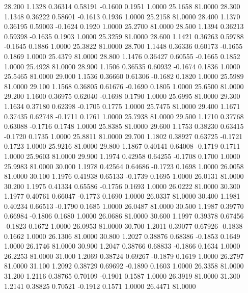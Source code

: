   28.200   1.1328   0.36314   0.58191  -0.1600   0.1951   1.0000  25.1658  81.0000
  28.300   1.1348   0.36222   0.58601  -0.1613   0.1936   1.0000  25.2158  81.0000
  28.400   1.1370   0.36195   0.59003  -0.1624   0.1920   1.0000  25.2700  81.0000
  28.500   1.1394   0.36213   0.59398  -0.1635   0.1903   1.0000  25.3259  81.0000
  28.600   1.1421   0.36263   0.59788  -0.1645   0.1886   1.0000  25.3822  81.0000
  28.700   1.1448   0.36336   0.60173  -0.1655   0.1869   1.0000  25.4379  81.0000
  28.800   1.1476   0.36427   0.60555  -0.1665   0.1852   1.0000  25.4928  81.0000
  28.900   1.1506   0.36535   0.60932  -0.1674   0.1836   1.0000  25.5465  81.0000
  29.000   1.1536   0.36660   0.61306  -0.1682   0.1820   1.0000  25.5989  81.0000
  29.100   1.1568   0.36805   0.61676  -0.1690   0.1805   1.0000  25.6500  81.0000
  29.200   1.1600   0.36975   0.62040  -0.1698   0.1790   1.0000  25.6995  81.0000
  29.300   1.1634   0.37180   0.62398  -0.1705   0.1775   1.0000  25.7475  81.0000
  29.400   1.1671   0.37435   0.62748  -0.1711   0.1761   1.0000  25.7938  81.0000
  29.500   1.1710   0.37768   0.63088  -0.1716   0.1748   1.0000  25.8385  81.0000
  29.600   1.1753   0.38230   0.63415  -0.1720   0.1735   1.0000  25.8811  81.0000
  29.700   1.1802   0.38927   0.63725  -0.1721   0.1723   1.0000  25.9216  81.0000
  29.800   1.1867   0.40141   0.64008  -0.1719   0.1711   1.0000  25.9603  81.0000
  29.900   1.1974   0.42958   0.64255  -0.1708   0.1700   1.0000  25.9983  81.0000
  30.000   1.1978   0.42564   0.64686  -0.1723   0.1698   1.0000  26.0058  81.0000
  30.100   1.1976   0.41938   0.65133  -0.1739   0.1695   1.0000  26.0131  81.0000
  30.200   1.1975   0.41334   0.65586  -0.1756   0.1693   1.0000  26.0222  81.0000
  30.300   1.1977   0.40761   0.66047  -0.1773   0.1690   1.0000  26.0337  81.0000
  30.400   1.1981   0.40234   0.66513  -0.1790   0.1685   1.0000  26.0487  81.0000
  30.500   1.1987   0.39770   0.66984  -0.1806   0.1680   1.0000  26.0686  81.0000
  30.600   1.1997   0.39378   0.67456  -0.1823   0.1672   1.0000  26.0953  81.0000
  30.700   1.2011   0.39077   0.67926  -0.1838   0.1662   1.0000  26.1306  81.0000
  30.800   1.2027   0.38876   0.68386  -0.1853   0.1649   1.0000  26.1746  81.0000
  30.900   1.2047   0.38766   0.68833  -0.1866   0.1634   1.0000  26.2253  81.0000
  31.000   1.2069   0.38724   0.69267  -0.1879   0.1619   1.0000  26.2797  81.0000
  31.100   1.2092   0.38729   0.69692  -0.1890   0.1603   1.0000  26.3358  81.0000
  31.200   1.2116   0.38765   0.70109  -0.1901   0.1587   1.0000  26.3919  81.0000
  31.300   1.2141   0.38825   0.70521  -0.1912   0.1571   1.0000  26.4471  81.0000
